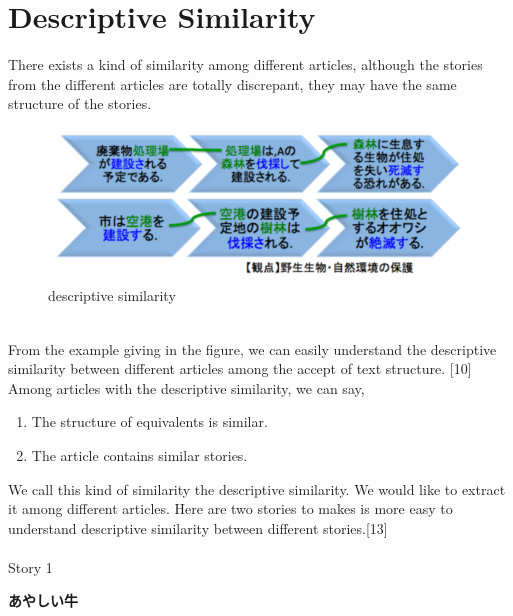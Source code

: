 \section{Descriptive Similarity}
There exists a kind of similarity among different articles, although the stories from the different articles are totally discrepant, they may have the same structure of the stories.
\\
\begin{figure}[!hbp]
\centering
\includegraphics[width=350pt]{./pictures/0102.png}
\caption{descriptive similarity}
\end{figure}
\\
From the example giving in the figure, we can easily understand the descriptive similarity between different articles among the accept of text structure. [10]
\\
Among articles with the descriptive similarity, we can say,
\begin{enumerate}
\item The structure of equivalents is similar.
\item The article contains similar stories.
\end{enumerate}
We call this kind of similarity the descriptive similarity. We would like to extract it among different articles.
Here are two stories to makes is more easy to understand descriptive similarity between different stories.[13]\\ \\
Story 1 
\begin{CJK}{UTF8}{ipxm}
\textbf{あやしい牛}
\end{CJK}
\\ \\ 
